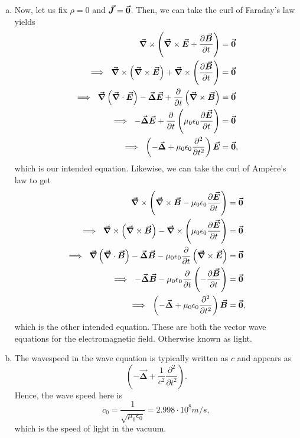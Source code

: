 \documentclass[12pt]{article} %
\newcommand{\vecfieldB}{\boldsymbol{\vec{B}}}
\newcommand{\vecfieldE}{\boldsymbol{\vec{E}}}
\newcommand{\vecfieldJ}{\boldsymbol{\vec{J}}}
\newcommand{\grad}{\boldsymbol{\vec{\nabla}}}
\newcommand{\veclaplace}{\boldsymbol{\vec{\Delta}}}
\begin{document}
\begin{solution}
\begin{enumerate}[(a)]
    \item Now, let us fix $\rho=0$ and $\vecfieldJ=\zerovec$.  Then, we can take the curl of Faraday's law yields
        \begin{align*}
            \grad \times \left(\grad \times \vecfieldE +  \frac{\partial \vecfieldB}{\partial t} \right) &=\zerovec\\
            \implies ~ \grad \times \left(\grad \times \vecfieldE\right) + \grad \times \left(\frac{\partial \vecfieldB}{\partial t} \right)&=\zerovec \\
            \implies ~ \grad \left( \grad \cdot \vecfieldE\right)-\veclaplace \vecfieldE + \frac{\partial}{\partial t} \left( \grad \times \vecfieldB\right)&=\zerovec\\
            \implies ~ -\veclaplace \vecfieldE +  \frac{\partial}{\partial t} \left(\mu_0 \epsilon_0 \frac{\partial \vecfieldE}{\partial t}\right) &= \zerovec\\
            \implies ~ \left( - \veclaplace + \mu_0 \epsilon_0 \frac{\partial^2 }{\partial t^2}\right) \vecfieldE &= \zerovec,
        \end{align*}
        which is our intended equation.  Likewise, we can take the curl of Amp\`ere's law to get
    \begin{align*}
        \grad \times \left(\grad \times \vecfieldB - \mu_0 \epsilon_0 \frac{\partial \vecfieldE}{\partial t} \right) &=\zerovec\\
        \implies ~ \grad \times \left(\grad \times \vecfieldB\right) - \grad \times \left(\mu_0 \epsilon_0\frac{\partial \vecfieldE}{\partial t} \right)&=\zerovec \\
        \implies ~ \grad \left( \grad \cdot \vecfieldB\right)-\veclaplace \vecfieldB - \mu_0\epsilon_0\frac{\partial}{\partial t} \left( \grad \times \vecfieldE\right)&=\zerovec\\
        \implies ~ -\veclaplace \vecfieldB - \mu_0 \epsilon_0 \frac{\partial}{\partial t} \left(-\frac{\partial \vecfieldB}{\partial t}\right) &= \zerovec\\
        \implies ~ \left( - \veclaplace + \mu_0 \epsilon_0 \frac{\partial^2 }{\partial t^2}\right) \vecfieldB &= \zerovec,
    \end{align*}
    which is the other intended equation. These are both the vector wave equations for the electromagnetic field. Otherwise known as light.
    
    \item The wavespeed in the wave equation is typically written as $c$ and appears as
    \[
    \left( - \veclaplace + \frac{1}{c^2} \frac{\partial^2 }{\partial t^2}\right).
    \]
    Hence, the wave speed here is
    \[
    c_0 = \frac{1}{\sqrt{\mu_0\epsilon_0}} = 2.998 \cdot 10^8 m/s,
    \]
    which is the speed of light in the vacuum.
\end{enumerate}
\end{solution}
\end{document}
